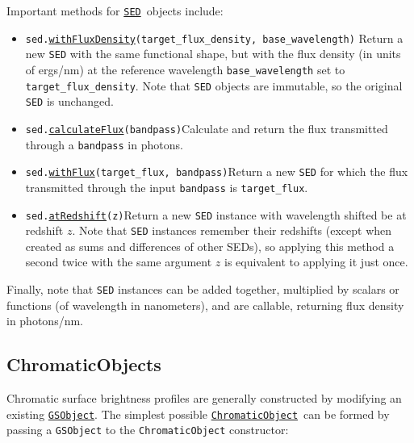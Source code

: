 \documentclass[preprint,10pt]{../../devel/modules/aastex}
\newcommand\GSObject{\href{http://galsim-developers.github.io/GalSim/classgalsim_1_1base_1_1_g_s_object.html}{\texttt{GSObject}}}
\newcommand\ChromaticObject{\href{http://galsim-developers.github.io/GalSim/classgalsim_1_1chromatic_1_1_chromatic_object.html}{\texttt{ChromaticObject}}}
\newcommand\SED{\href{http://galsim-developers.github.io/GalSim/classgalsim_1_1sed_1_1_s_e_d.html}{\texttt{SED}}}
\begin{document}
Important methods for \SED\ objects include:
\begin{itemize}
\item \texttt{sed.\href{http://galsim-developers.github.io/GalSim/classgalsim_1_1sed_1_1_s_e_d.html\#abd38352d0cd9327ba255b8f327562992}{withFluxDensity}(target\_flux\_density,
    base\_wavelength)} \newline Return a new \texttt{SED} with the same functional shape, 
    but with the flux
  density (in units of ergs/nm) at the reference
  wavelength \texttt{base\_wavelength} set to
  \texttt{target\_flux\_density}.  Note that \texttt{SED} objects are
  immutable, so the original \texttt{SED} is unchanged.
\item \texttt{sed.\href{http://galsim-developers.github.io/GalSim/classgalsim_1_1sed_1_1_s_e_d.html\#ab20b0c861f5b6a6604fe838b83a4d6cc}{calculateFlux}(bandpass)}\newline Calculate and return the flux transmitted through a
  \texttt{bandpass} in photons.
\item \texttt{sed.\href{http://galsim-developers.github.io/GalSim/classgalsim_1_1sed_1_1_s_e_d.html\#a33613fdc3b0f99534971e9651ea2e659}{withFlux}(target\_flux, bandpass)}\newline Return a new \texttt{SED}
  for which the flux transmitted through the input \texttt{bandpass} is \texttt{target\_flux}.
\item \texttt{sed.\href{http://galsim-developers.github.io/GalSim/classgalsim_1_1sed_1_1_s_e_d.html\#a9d49d109ff539f61ab022e1be6391b12}{atRedshift}(z)}\newline Return a new \texttt{SED} instance with wavelength shifted be at redshift $z$.
  Note that \texttt{SED} instances remember their redshifts (except when created as sums and differences of
  other SEDs), so applying this method a second twice with the same argument $z$ is equivalent to
  applying it just once.
\end{itemize}

Finally, note that \texttt{SED} instances can be added together, multiplied by scalars or functions (of
wavelength in nanometers), and are callable, returning flux density in photons/nm.

\subsection{ChromaticObjects}

Chromatic surface brightness profiles are generally constructed by modifying an existing
\GSObject.  The simplest possible \ChromaticObject\ can be formed by passing a
\texttt{GSObject} to the \texttt{ChromaticObject} constructor:
\end{document}
